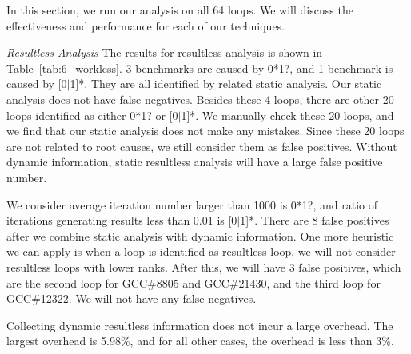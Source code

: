 In this section, we run our analysis on all 64 loops. 
We will discuss the effectiveness and performance for each of our techniques. 

\underline{\textit{Resultless Analysis}}
The results for resultless analysis is shown in Table~\ref{tab:6_workless}.
3 benchmarks are caused by 0*1?, and 1 benchmark is caused by [0$|$1]*. 
They are all identified by related static analysis. Our static analysis does not have false negatives. 
Besides these 4 loops, there are other 20 loops identified as either 0*1? or [0$|$1]*. 
We manually check these 20 loops, and we find that our static analysis does not make any mistakes. 
Since these 20 loops are not related to root causes, we still consider them as false positives. 
Without dynamic information, static resultless analysis will have a large false positive number. 

We consider average iteration number larger than 1000 is 0*1?, and ratio of iterations generating results less than 0.01 is [0$|$1]*. 
There are 8 false positives after we combine static analysis with dynamic information. 
One more heuristic we can apply is when a loop is identified as resultless loop, 
we will not consider resultless loops with lower ranks. After this, we will have 3 false positives, 
which are the second loop for GCC\#8805 and GCC\#21430, and the third loop for GCC\#12322. We will not have any false negatives. 

Collecting dynamic resultless information does not incur a large overhead. The largest overhead is 5.98\%, and for all other cases, the overhead is less than 3\%. 


